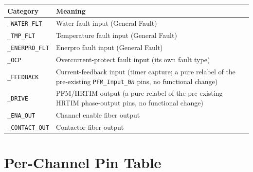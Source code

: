 \documentclass[11pt]{article}
\newcommand{\code}[1]{\texttt{#1}}
\begin{document}
\begin{center}
\begin{tabular}{p{1.3in} p{3.2in}}
  \hline
  \textbf{Category} & \textbf{Meaning} \\
  \hline
  \code{\_WATER\_FLT} & Water fault input (General Fault) \\
  \code{\_TMP\_FLT} & Temperature fault input (General Fault) \\
  \code{\_ENERPRO\_FLT} & Enerpro fault input (General Fault) \\
  \code{\_OCP} & Overcurrent-protect fault input (its own fault type) \\
  \code{\_FEEDBACK} & Current-feedback input (timer capture; a pure
    relabel of the pre-existing \code{PFM\_Input\_0\emph{n}} pins, no
    functional change) \\
  \code{\_DRIVE} & PFM/HRTIM output (a pure relabel of the pre-existing
    HRTIM phase-output pins, no functional change) \\
  \code{\_ENA\_OUT} & Channel enable fiber output \\
  \code{\_CONTACT\_OUT} & Contactor fiber output \\
  \hline
\end{tabular}
\end{center}

\section{Per-Channel Pin Table}
\label{sec:per-channel}
\end{document}
